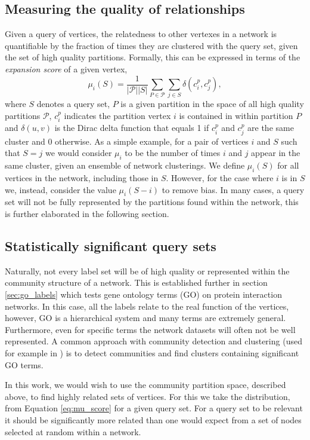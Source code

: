 \documentclass[sigconf]{acmart}
\begin{document}
\subsection{Measuring the quality of relationships} \label{sec:expansion}
Given a query of vertices, the relatedness to other vertexes in a network is quantifiable by the fraction of times they are clustered with the query set, given the set of high quality partitions.
Formally, this can be expressed in terms of the \textit{expansion score} of a given vertex,
\begin{equation} \label{eq:mu_score}
\mu_i(S) = \frac{1}{|\mathcal{P}| |S| } \sum_{P \in \mathcal{P}} \sum_{j \in S} \delta(c^{p}_i, c^{p}_j),
\end{equation}
where $S$ denotes a query set, $P$ is a given partition in the space of all high quality partitions $\mathcal{P}$, $c^{p}_{i}$ indicates the partition vertex $i$ is contained in within partition $P$ and
$\delta(u, v)$ is the Dirac delta function that equals 1 if $c^{p}_i$ and  $c^{p}_j$ are the same cluster and $0$ otherwise.
As a simple example, for a pair of vertices $i$ and $S$ such that $S = {j}$ we would consider $\mu_i$ to be the number of times $i$ and $j$ appear in the same cluster, given an ensemble of network clusterings.
We define $\mu_i(S)$ for all vertices in the network, including those in $S$.
However, for the case where $i$ is in $S$ we, instead, consider the value $\mu_i(S - i)$ to remove bias.
In many cases, a query set will not be fully represented by the partitions found within the network, this is further elaborated in the following section.

\subsection{Statistically significant query sets}
Naturally, not every label set will be of high quality or represented within the community structure of a network.
This is established further in section \ref{sec:go_labels} which tests gene ontology terms (GO) on protein interaction networks.
In this case, all the labels relate to the real function of the vertices, however, GO is a hierarchical system and many terms are extremely general.
Furthermore, even for specific terms the network datasets will often not be well represented.
A common approach with community detection and clustering (used for example in \cite{dekkers2013}) is to detect communities and find clusters containing significant GO terms.

In this work, we would wish to use the community partition space, described above, to find highly related sets of vertices.
For this we take the distribution, from Equation \ref{eq:mu_score} for a given query set.
For a query set to be relevant it should be significantly more related than one would expect from a set of nodes selected at random within a network.
\end{document}
